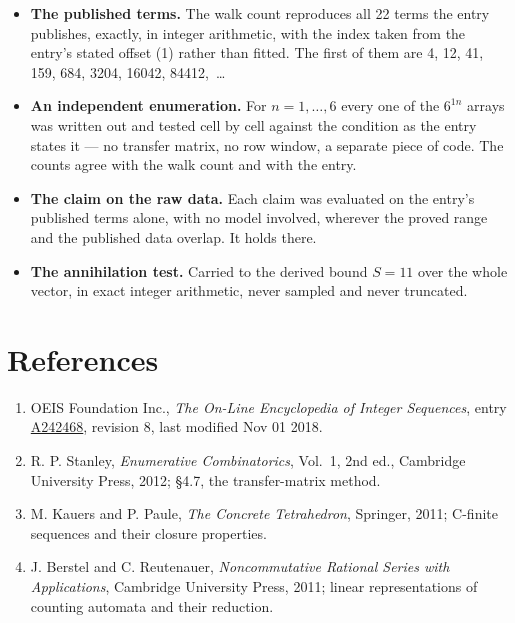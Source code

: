 \documentclass[11pt]{article}
\theoremstyle{definition}
\begin{document}
\begin{itemize}

\item {\bfseries The published terms.} The walk count reproduces all 22 terms the entry publishes, exactly, in integer arithmetic, with the index taken from the entry's stated offset (1) rather than fitted. The first of them are 4, 12, 41, 159, 684, 3204, 16042, 84412,~\dots

\item {\bfseries An independent enumeration.} For $n = 1,\dots,6$ every one of the $6^{1n}$ arrays was written out and tested cell by cell against the condition as the entry states it --- no transfer matrix, no row window, a separate piece of code. The counts agree with the walk count and with the entry.

\item {\bfseries The claim on the raw data.} Each claim was evaluated on the entry's published terms alone, with no model involved, wherever the proved range and the published data overlap. It holds there.

\item {\bfseries The annihilation test.} Carried to the derived bound $S = 11$ over the whole vector, in exact integer arithmetic, never sampled and never truncated.

\end{itemize}

\section{References}

\begin{enumerate}

\item OEIS Foundation Inc., \emph{The On-Line Encyclopedia of Integer Sequences}, entry \href{https://oeis.org/A242468}{A242468}, revision 8, last modified Nov 01 2018.

\item R. P. Stanley, \emph{Enumerative Combinatorics}, Vol.~1, 2nd ed., Cambridge University Press, 2012; \S4.7, the transfer-matrix method.

\item M. Kauers and P. Paule, \emph{The Concrete Tetrahedron}, Springer, 2011; C-finite sequences and their closure properties.

\item J. Berstel and C. Reutenauer, \emph{Noncommutative Rational Series with Applications}, Cambridge University Press, 2011; linear representations of counting automata and their reduction.

\end{enumerate}
\end{document}
